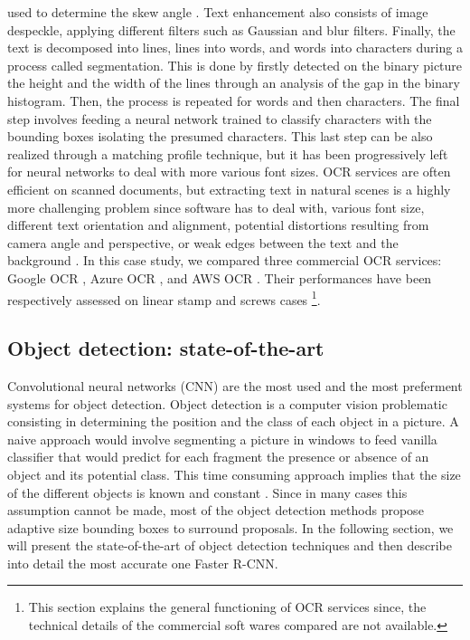 \documentclass[12pt, french, a4paper]{article} %
\begin{document}
used to determine the skew angle \cite{parashar2012finding}. Text enhancement also consists of image despeckle, applying different filters such as Gaussian and blur filters. Finally, the text is decomposed into lines, lines into words, and words into characters during a process called segmentation. This is done by firstly detected on the binary picture the height and the width of the lines through an analysis of the gap in the binary histogram. Then, the process is repeated for words and then characters. The final step involves feeding a neural network trained to classify characters with the bounding boxes isolating the presumed characters. This last step can be also realized through a matching profile technique, but it has been progressively left for neural networks to deal with more various font sizes. \gls{OCR} services are often efficient on scanned documents, but extracting text in natural scenes is a highly more challenging problem since software has to deal with, various font size, different text orientation and alignment, potential distortions resulting from camera angle and perspective, or weak edges between the text and the background \cite{zhang2013text}. In this case study, we compared three commercial \gls{OCR} services: Google OCR \cite{GoogleOCR}, Azure OCR \cite{AzureOCR}, and AWS OCR \cite{AWSOCR}. Their performances have been respectively assessed on linear stamp and screws cases \footnote{This section explains the general functioning of OCR services since, the technical details of the commercial soft wares compared are not available.}.
 


\subsection{Object detection: state-of-the-art}
Convolutional neural networks (\gls{CNN}) are the most used and the most preferment systems for object detection. Object detection is a computer vision problematic consisting in determining the position and the class of each object in a picture. A naive approach would involve segmenting a picture in windows to feed vanilla classifier that would predict for each fragment the presence or absence of an object and its potential class. This time consuming approach implies that the size of the different objects is known and constant \cite{michelucci2019advanced}. Since in many cases this assumption cannot be made, most of the object detection methods propose adaptive size bounding boxes to surround proposals. In the following section, we will present the state-of-the-art of object detection techniques and then describe into detail the most accurate one Faster \gls{R-CNN}. 
\end{document}
